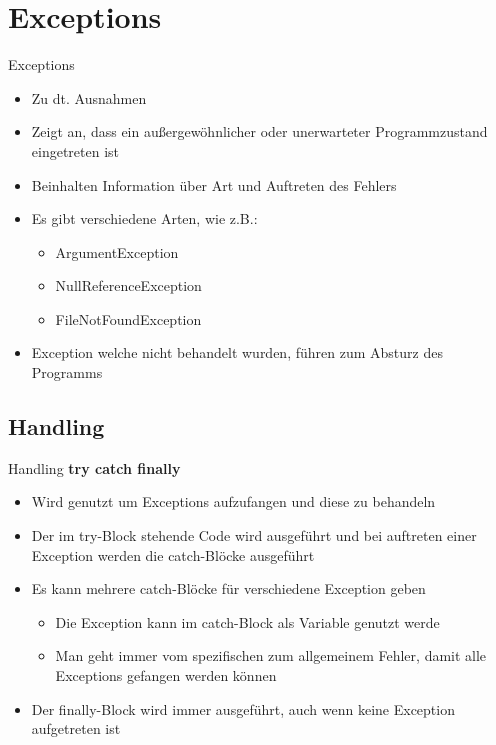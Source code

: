 \section{Exceptions}
\begin{frame}{Exceptions}
	\begin{itemize}
		\item Zu dt. Ausnahmen
		\item Zeigt an, dass ein außergewöhnlicher oder unerwarteter Programmzustand eingetreten ist
		\item Beinhalten Information über Art und Auftreten des Fehlers
		\item Es gibt verschiedene Arten, wie z.B.:
		\begin{itemize} 
			\item ArgumentException
			\item NullReferenceException	
			\item FileNotFoundException
		\end{itemize}
		\item Exception welche nicht behandelt wurden, führen zum Absturz des Programms
	\end{itemize}
\end{frame}

\subsection{Handling}
\begin{frame}{Handling}
	\textbf{try catch finally}\\
	\begin{itemize}
		\item Wird genutzt um Exceptions aufzufangen und diese zu behandeln
		\item Der im \alert{try}-Block stehende Code wird ausgeführt und bei auftreten einer Exception werden die \alert{catch}-Blöcke ausgeführt
		\item Es kann mehrere \alert{catch}-Blöcke für verschiedene Exception geben
		\begin{itemize}
			\item Die Exception kann im \alert{catch}-Block als Variable genutzt werde
			\item Man geht immer vom spezifischen zum allgemeinem Fehler, damit alle Exceptions gefangen werden können
		\end{itemize}
		\item Der \alert{finally}-Block wird immer ausgeführt, auch wenn keine Exception aufgetreten ist
	\end{itemize}
\end{frame}

